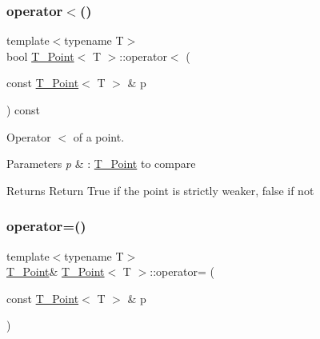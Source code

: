 \mbox{\label{classT__Point_a95cb559fe5888b44481f6ad3aebabefe}} 
\subsubsection{\texorpdfstring{operator$<$()}{operator<()}}
{\footnotesize\ttfamily template$<$typename T$>$ \\
bool \hyperlink{classT__Point}{T\+\_\+\+Point}$<$ T $>$\+::operator$<$ (\begin{DoxyParamCaption}\item[{const \hyperlink{classT__Point}{T\+\_\+\+Point}$<$ T $>$ \&}]{p }\end{DoxyParamCaption}) const\hspace{0.3cm}{\ttfamily [inline]}}



Operator $<$ of a point. 


\begin{DoxyParams}{Parameters}
{\em p} & \+: \hyperlink{classT__Point}{T\+\_\+\+Point} to compare \\
\hline
\end{DoxyParams}
\begin{DoxyReturn}{Returns}
Return True if the point is strictly weaker, false if not 
\end{DoxyReturn}
\mbox{\label{classT__Point_a13fbb5646f2333aa41194d648423e10f}} 
\subsubsection{\texorpdfstring{operator=()}{operator=()}}
{\footnotesize\ttfamily template$<$typename T$>$ \\
\hyperlink{classT__Point}{T\+\_\+\+Point}\& \hyperlink{classT__Point}{T\+\_\+\+Point}$<$ T $>$\+::operator= (\begin{DoxyParamCaption}\item[{const \hyperlink{classT__Point}{T\+\_\+\+Point}$<$ T $>$ \&}]{p }\end{DoxyParamCaption})\hspace{0.3cm}{\ttfamily [inline]}}



